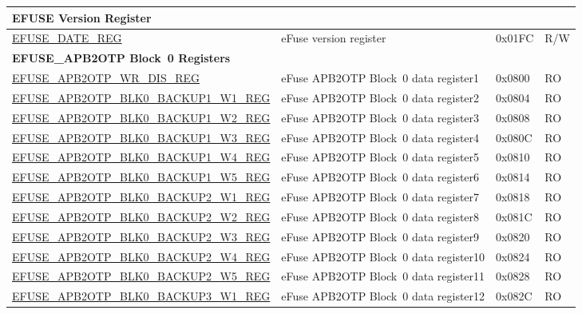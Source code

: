 \begin{longtable}{ | p{7cm} | p{6cm} | p{1.2cm} | p{1.5cm} | }
\multicolumn{4}{|l|}{\textbf{EFUSE Version Register}} \\ \hline
\hyperref[regdesc:EFUSEDATEREG]{EFUSE\_DATE\_REG} & eFuse version register & 0x01FC & R/W \\ \hline
\multicolumn{4}{|l|}{\textbf{EFUSE\_APB2OTP Block~0 Registers}} \\ \hline
{\hyperref[regdesc:EFUSEAPB2OTPWRDISREG]{EFUSE\_APB2OTP\_WR\_DIS\_REG}} & eFuse APB2OTP Block~0 data register1 & 0x0800 & RO \\\hline
\hyperref[regdesc:EFUSEAPB2OTPBLK0BACKUP1WNREG]{EFUSE\_APB2OTP\_BLK0\_BACKUP1\_W1\_REG} & eFuse APB2OTP Block~0 data register2 & 0x0804 & RO \\\hline
\hyperref[regdesc:EFUSEAPB2OTPBLK0BACKUP1WNREG]{EFUSE\_APB2OTP\_BLK0\_BACKUP1\_W2\_REG} & eFuse APB2OTP Block~0 data register3 & 0x0808 & RO \\\hline
\hyperref[regdesc:EFUSEAPB2OTPBLK0BACKUP1WNREG]{EFUSE\_APB2OTP\_BLK0\_BACKUP1\_W3\_REG} & eFuse APB2OTP Block~0 data register4 & 0x080C & RO \\\hline
\hyperref[regdesc:EFUSEAPB2OTPBLK0BACKUP1WNREG]{EFUSE\_APB2OTP\_BLK0\_BACKUP1\_W4\_REG} & eFuse APB2OTP Block~0 data register5 & 0x0810 & RO \\\hline
\hyperref[regdesc:EFUSEAPB2OTPBLK0BACKUP1WNREG]{EFUSE\_APB2OTP\_BLK0\_BACKUP1\_W5\_REG} & eFuse APB2OTP Block~0 data register6 & 0x0814 & RO \\\hline
\hyperref[regdesc:EFUSEAPB2OTPBLK0BACKUP2WNREG]{EFUSE\_APB2OTP\_BLK0\_BACKUP2\_W1\_REG} & eFuse APB2OTP Block~0 data register7 & 0x0818 & RO \\\hline
\hyperref[regdesc:EFUSEAPB2OTPBLK0BACKUP2WNREG]{EFUSE\_APB2OTP\_BLK0\_BACKUP2\_W2\_REG} & eFuse APB2OTP Block~0 data register8 & 0x081C & RO \\\hline
\hyperref[regdesc:EFUSEAPB2OTPBLK0BACKUP2WNREG]{EFUSE\_APB2OTP\_BLK0\_BACKUP2\_W3\_REG} & eFuse APB2OTP Block~0 data register9 & 0x0820 & RO \\\hline
\hyperref[regdesc:EFUSEAPB2OTPBLK0BACKUP2WNREG]{EFUSE\_APB2OTP\_BLK0\_BACKUP2\_W4\_REG} & eFuse APB2OTP Block~0 data register10 & 0x0824 & RO \\\hline
\hyperref[regdesc:EFUSEAPB2OTPBLK0BACKUP2WNREG]{EFUSE\_APB2OTP\_BLK0\_BACKUP2\_W5\_REG} & eFuse APB2OTP Block~0 data register11 & 0x0828 & RO \\\hline
\hyperref[regdesc:EFUSEAPB2OTPBLK0BACKUP3WNREG]{EFUSE\_APB2OTP\_BLK0\_BACKUP3\_W1\_REG} & eFuse APB2OTP Block~0 data register12 & 0x082C & RO \\\hline

\end{longtable}
